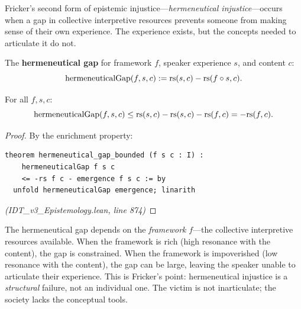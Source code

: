 Fricker's second form of epistemic injustice---\emph{hermeneutical injustice}---occurs
when a gap in collective interpretive resources prevents someone from making
sense of their own experience. The experience exists, but the concepts needed
to articulate it do not.

\begin{definition}
\label{def:hermeneutical-gap}
The \textbf{hermeneutical gap} for framework $f$, speaker experience $s$,
and content $c$:
\[
  \mathrm{hermeneuticalGap}(f, s, c) := \mathrm{rs}(s, c) - \mathrm{rs}(f \circ s, c).
\]
\end{definition}

\begin{theorem}
\label{thm:hermeneutical-bounded}
For all $f, s, c$:
\[
  \mathrm{hermeneuticalGap}(f, s, c) \leq \mathrm{rs}(s, c) - \mathrm{rs}(s, c) - \mathrm{rs}(f, c) = -\mathrm{rs}(f, c).
\]
\end{theorem}

\begin{proof}
By the enrichment property:
\begin{lstlisting}
theorem hermeneutical_gap_bounded (f s c : I) :
    hermeneuticalGap f s c
    <= -rs f c - emergence f s c := by
  unfold hermeneuticalGap emergence; linarith
\end{lstlisting}
\textit{(IDT\_v3\_Epistemology.lean, line 874)}
\end{proof}

\begin{interpretation}
The hermeneutical gap depends on the \emph{framework} $f$---the collective
interpretive resources available. When the framework is rich (high resonance
with the content), the gap is constrained. When the framework is impoverished
(low resonance with the content), the gap can be large, leaving the speaker
unable to articulate their experience. This is Fricker's point: hermeneutical
injustice is a \emph{structural} failure, not an individual one. The victim
is not inarticulate; the society lacks the conceptual tools.
\end{interpretation}

